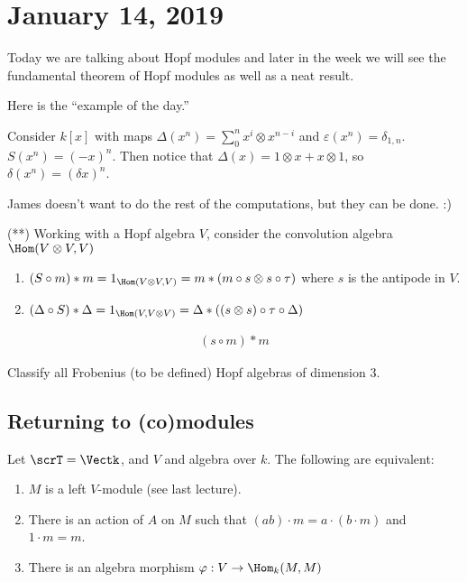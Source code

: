 \documentclass[12pt]{article}
\begin{document}
\section{January 14, 2019}
Today we are talking about Hopf modules and later in the week we will see the fundamental
theorem of Hopf modules as well as a neat result.

Here is the ``example of the day.''
\begin{ex}
	Consider $k[x]$ with maps $\Delta(x^n)=\sum_0^nx^i\otimes x^{n-i}$ and $\varepsilon(x^n)=\delta_{1,n}$. 
	$S(x^n)=(-x)^n$. Then notice that $\Delta(x)=1\otimes x+x\otimes 1$, so $\delta(x^n)=(\delta x)^n$.

	James doesn't want to do the rest of the computations, but they can be done. :)
\end{ex}

\begin{prob}\label{prob-4.1}
	(**) Working with a Hopf algebra $V$, consider the convolution algebra $\Hom(V\otimes V,V)$
	\begin{enumerate}
		\item $(S\circ m)\ast m=1_{\Hom(V\otimes V,V)}=m\ast(m\circ s\otimes s\circ\tau)$ where $s$ is the antipode in $V$.
		\item $(\Delta\circ S)\ast \Delta=1_{\Hom(V,V\otimes V)}=\Delta\ast((s\otimes s)\circ\tau\circ \Delta)$
	\end{enumerate}
\end{prob}
\begin{sol}
	\begin{align*}
		(s\circ m)\ast m
	\end{align*}
\end{sol}
\begin{prob}
	Classify all Frobenius (to be defined) Hopf algebras of dimension 3.
\end{prob}

\subsection{Returning to (co)modules}\label{subsec-comod}
\begin{lem}
	Let $\scrT=\Vectk$, and $V$ and algebra over $k$. The following are equivalent:
	\begin{enumerate}
		\item $M$ is a left $V$-module (see last lecture).
		\item There is an action of $A$ on $M$ such that $(ab)\cdot m=a\cdot (b\cdot m)$ and $1\cdot m=m$.
		\item There is an algebra morphism $\varphi:V\to\Hom_k(M,M)$
	\end{enumerate}
\end{lem}
\end{document}
